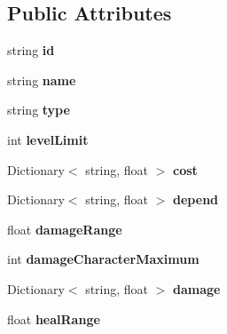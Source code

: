 \subsection*{Public Attributes}
\begin{DoxyCompactItemize}
\item 
string {\bfseries id}\hypertarget{class_battle_skill_ae916ee25f727882c381c71fcffa5839d}{}\label{class_battle_skill_ae916ee25f727882c381c71fcffa5839d}

\item 
string {\bfseries name}\hypertarget{class_battle_skill_ac6a3e0fefe13498eb16b67f202c860f2}{}\label{class_battle_skill_ac6a3e0fefe13498eb16b67f202c860f2}

\item 
string {\bfseries type}\hypertarget{class_battle_skill_ac2942454b579ae2eff1c8692acd0c454}{}\label{class_battle_skill_ac2942454b579ae2eff1c8692acd0c454}

\item 
int {\bfseries level\+Limit}\hypertarget{class_battle_skill_ae748075b6e17d2414f660a23bd9cd9b5}{}\label{class_battle_skill_ae748075b6e17d2414f660a23bd9cd9b5}

\item 
Dictionary$<$ string, float $>$ {\bfseries cost}\hypertarget{class_battle_skill_ab8ea5c0dcabd89f66e567af0497ff7c2}{}\label{class_battle_skill_ab8ea5c0dcabd89f66e567af0497ff7c2}

\item 
Dictionary$<$ string, float $>$ {\bfseries depend}\hypertarget{class_battle_skill_a4a4d4bc0e93d04a084d8937956ddccdb}{}\label{class_battle_skill_a4a4d4bc0e93d04a084d8937956ddccdb}

\item 
float {\bfseries damage\+Range}\hypertarget{class_battle_skill_a8a422f798c6094e04edc9b84f7a2aa23}{}\label{class_battle_skill_a8a422f798c6094e04edc9b84f7a2aa23}

\item 
int {\bfseries damage\+Character\+Maximum}\hypertarget{class_battle_skill_a8d238b9919b5466753a46a8600f999d4}{}\label{class_battle_skill_a8d238b9919b5466753a46a8600f999d4}

\item 
Dictionary$<$ string, float $>$ {\bfseries damage}\hypertarget{class_battle_skill_acddb548d9e6908f04fbfd081ae3abb2b}{}\label{class_battle_skill_acddb548d9e6908f04fbfd081ae3abb2b}

\item 
float {\bfseries heal\+Range}\hypertarget{class_battle_skill_afb6a9bf7af35accb9626a2ad2a109df5}{}\label{class_battle_skill_afb6a9bf7af35accb9626a2ad2a109df5}


\end{DoxyCompactItemize}
